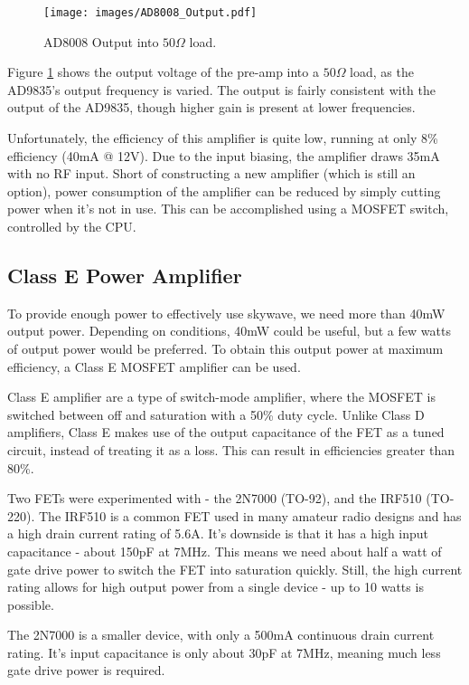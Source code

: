\documentclass[a4paper,12pt]{article}
\begin{document}
\begin{figure}[h]
  \begin{center}
    \texttt{[image: images/AD8008\_Output.pdf]}
  \end{center}
  \caption{AD8008 Output into $50\Omega$ load.}
  \label{fig:ad8008_output}
\end{figure}

Figure \ref{fig:ad8008_output} shows the output voltage of the pre-amp into a $50\Omega$ load, as the AD9835's output frequency is varied. The output is fairly consistent with the output of the AD9835, though higher gain is present at lower frequencies. 

Unfortunately, the efficiency of this amplifier is quite low, running at only 8\% efficiency (40mA @ 12V). Due to the input biasing, the amplifier draws 35mA with no RF input. Short of constructing a new amplifier (which is still an option), power consumption of the amplifier can be reduced by simply cutting power when it's not in use. This can be accomplished using a MOSFET switch, controlled by the CPU. 

\subsection{Class E Power Amplifier}
To provide enough power to effectively use skywave, we need more than 40mW output power. Depending on conditions, 40mW could be useful, but a few watts of output power would be preferred. To obtain this output power at maximum efficiency, a Class E MOSFET amplifier can be used.

Class E amplifier are a type of switch-mode amplifier, where the MOSFET is switched between off and saturation with a 50\% duty cycle. Unlike Class D amplifiers, Class E makes use of the output capacitance of the FET as a tuned circuit, instead of treating it as a loss. This can result in efficiencies greater than 80\%.

Two FETs were experimented with - the 2N7000 (TO-92), and the IRF510 (TO-220). The IRF510 is a common FET used in many amateur radio designs and has a high drain current rating of 5.6A. It's downside is that it has a high input capacitance - about 150pF at 7MHz. This means we need about half a watt of gate drive power to switch the FET into saturation quickly. Still, the high current rating allows for high output power from a single device - up to 10 watts is possible.

The 2N7000 is a smaller device, with only a 500mA continuous drain current rating. It's input capacitance is only about 30pF at 7MHz, meaning much less gate drive power is required. 
\end{document}
